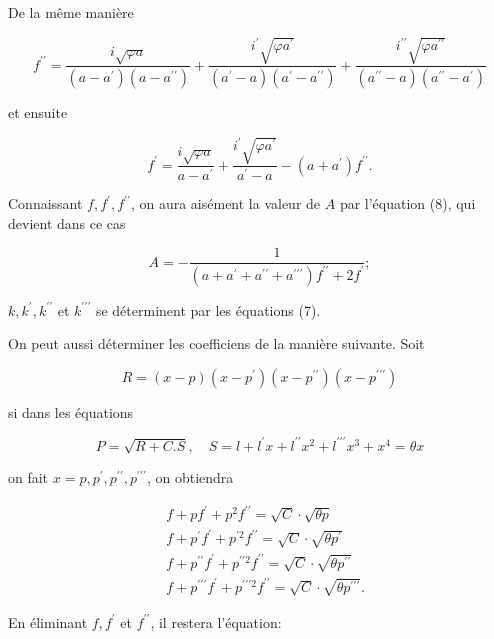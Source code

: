 \documentclass{article}
\begin{document}
De la même manière

\[
f^{\prime \prime}=\frac{i \sqrt{\varphi a}}{\left(a-a^{\prime}\right)\left(a-a^{\prime \prime}\right)}+\frac{i^{\prime} \sqrt{\varphi a^{\prime}}}{\left(a^{\prime}-a\right)\left(a^{\prime}-a^{\prime \prime}\right)}+\frac{i^{\prime \prime} \sqrt{\varphi a^{\prime \prime}}}{\left(a^{\prime \prime}-a\right)\left(a^{\prime \prime}-a^{\prime}\right)}
\]

et ensuite

\[
f^{\prime}=\frac{i \sqrt{\varphi a}}{a-a^{\prime}}+\frac{i^{\prime} \sqrt{\varphi a^{\prime}}}{a^{\prime}-a}-\left(a+a^{\prime}\right) f^{\prime \prime} .
\]

Connaissant \(f, f^{\prime}, f^{\prime \prime}\), on aura aisément la valeur de \(A\) par l'équation (8), qui devient dans ce cas

\[
A=-\frac{1}{\left(a+a^{\prime}+a^{\prime \prime}+a^{\prime \prime \prime}\right) f^{\prime \prime}+2 f^{\prime}} ;
\]

\(k, k^{\prime}, k^{\prime \prime}\) et \(k^{\prime \prime \prime}\) se déterminent par les équations (7).

On peut aussi déterminer les coefficiens de la manière suivante. Soit

\[
R=(x-p)\left(x-p^{\prime}\right)\left(x-p^{\prime \prime}\right)\left(x-p^{\prime \prime \prime}\right)
\]

si dans les équations

\[
P=\sqrt{R+C . S}, \quad S=l+l^{\prime} x+l^{\prime \prime} x^{2}+l^{\prime \prime \prime} x^{3}+x^{4}=\theta x
\]

on fait \(x=p, p^{\prime}, p^{\prime \prime}, p^{\prime \prime \prime}\), on obtiendra

\[
\begin{aligned}
& f+p f^{\prime}+p^{2} f^{\prime \prime}=\sqrt{C} \cdot \sqrt{\theta p} \\
& f+p^{\prime} f^{\prime}+p^{\prime 2} f^{\prime \prime}=\sqrt{C} \cdot \sqrt{\theta p^{\prime}} \\
& f+p^{\prime \prime} f^{\prime}+p^{\prime \prime 2} f^{\prime \prime}=\sqrt{C} \cdot \sqrt{\theta p^{\prime \prime}} \\
& f+p^{\prime \prime \prime} f^{\prime}+p^{\prime \prime \prime 2} f^{\prime \prime}=\sqrt{C} \cdot \sqrt{\theta p^{\prime \prime \prime}} .
\end{aligned}
\]

En éliminant \(f, f^{\prime}\) et \(f^{\prime \prime}\), il restera l'équation:
\end{document}
